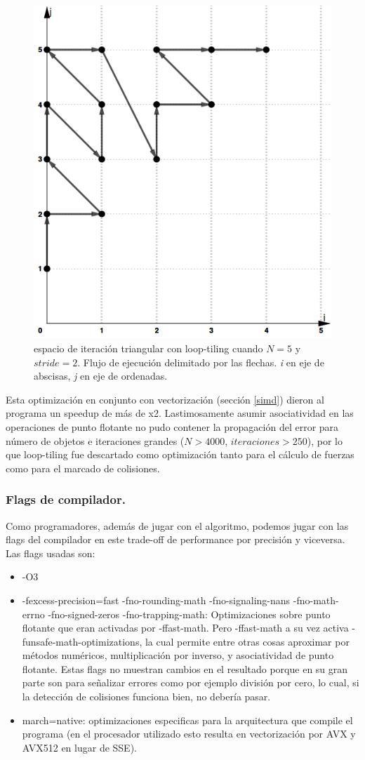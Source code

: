 \documentclass{article}
\begin{document}
\begin{figure}[h!]
	\centering
	\includegraphics[width=0.6\linewidth,height=0.6\textwidth]{resources/loop_anidado_tiling_505x565.png}
	\caption{espacio de iteración triangular con loop-tiling cuando $N=5$ y $stride=2$. Flujo de ejecución
	delimitado por las flechas. \textit{i} en eje de abscisas, \textit{j} en eje de ordenadas.}
	\label{fig:no_tiling}
\end{figure}


Esta optimización en conjunto con vectorización (sección \ref{simd}) dieron al programa un speedup de más de x2.
Lastimosamente asumir asociatividad en las operaciones de punto flotante no pudo contener la propagación del error
para número de objetos e iteraciones grandes ($N > 4000$, $iteraciones > 250$), por lo que loop-tiling fue descartado
como optimización tanto para el cálculo de fuerzas como para el marcado de colisiones.

\subsubsection{Flags de compilador.}
Como programadores, además de jugar con el algoritmo, podemos jugar con las flags
del compilador en este trade-off de performance por precisión y viceversa.
Las flags usadas son:
\begin{itemize}
		\item -O3
		\item -fexcess-precision=fast -fno-rounding-math -fno-signaling-nans
			-fno-math-errno -fno-signed-zeros -fno-trapping-math: Optimizaciones
			sobre punto flotante que eran activadas por -ffast-math. Pero -ffast-math
			a su vez activa -funsafe-math-optimizations, la cual permite entre otras
			cosas aproximar por métodos numéricos, multiplicación por inverso, y asociatividad
			de punto flotante. Estas flags no muestran cambios en el resultado porque en su
			gran parte son para señalizar errores como por ejemplo división por cero, lo cual, si la detección
			de colisiones funciona bien, no debería pasar.
		\item march=native: optimizaciones especificas para la arquitectura que compile el programa (en el procesador
			utilizado esto resulta en vectorización por AVX y AVX512 en lugar de SSE).
\end{itemize}
\end{document}
